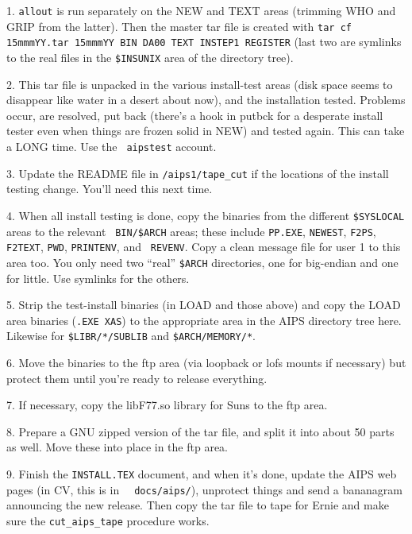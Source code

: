 \item{1.} {\tt allout} is run separately on the NEW and TEXT areas
	  (trimming WHO and GRIP from the latter).  Then the master tar
	  file is created with {\tt tar cf 15mmmYY.tar 15mmmYY BIN DA00
	  TEXT INSTEP1 REGISTER} (last two are symlinks to the real
	  files in the {\tt\$INSUNIX} area of the directory tree).
\item{2.} This tar file is unpacked in the various install-test areas
	  (disk space seems to disappear like water in a desert about
	  now), and the installation tested.  Problems occur, are
	  resolved, put back (there's a hook in putbck for a desperate
	  install tester even when things are frozen solid in NEW) and
	  tested again.  This can take a LONG time.  Use the {\tt
	  aipstest} account.
\item{3.} Update the README file in {\tt /aips1/tape\_cut} if the
	  locations of the install testing change.  You'll need this
          next time.
\item{4.} When all install testing is done, copy the binaries from the
          different {\tt\$SYSLOCAL} areas to the relevant {\tt
          BIN/\$ARCH} areas; these include {\tt PP.EXE}, {\tt NEWEST},
          {\tt F2PS}, {\tt F2TEXT}, {\tt PWD}, {\tt PRINTENV}, and {\tt
          REVENV}.  Copy a clean message file for user 1 to this area
          too.  You only need two ``real'' {\tt\$ARCH} directories, one
          for big-endian and one for little.  Use symlinks for the
          others.
\item{5.} Strip the test-install binaries (in LOAD and those above) and
          copy the LOAD area binaries ({\tt *.EXE XAS}) to the
          appropriate area in the AIPS directory tree here.  Likewise
          for {\tt \$LIBR/*/SUBLIB} and {\tt \$ARCH/MEMORY/*}.
\item{6.} Move the binaries to the ftp area (via loopback or lofs mounts
          if necessary) but protect them until you're ready to release
          everything.
\item{7.} If necessary, copy the libF77.so library for Suns to the ftp
          area.
\item{8.} Prepare a GNU zipped version of the tar file, and split it
          into about 50 parts as well.  Move these into place in the
          ftp area.
\item{9.} Finish the {\tt INSTALL.TEX} document, and when it's done,
          update the AIPS web pages (in CV, this is in {\tt
          ~{}docs/aips/}), unprotect things and send a bananagram
          announcing the new release.  Then copy the tar file to tape
          for Ernie and make sure the {\tt cut\_aips\_tape} procedure
          works.

